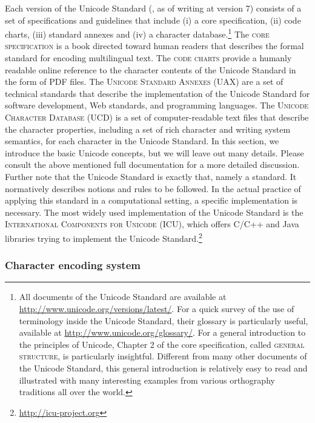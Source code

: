 Each version of the Unicode Standard (\citealp{Unicode2014}, as of writing at
version 7) consists of a set of specifications and guidelines that include (i) a
core specification, (ii) code charts, (iii) standard annexes and (iv) a
character database.\footnote{All documents of the Unicode Standard are available
at \url{http://www.unicode.org/versions/latest/}. For a quick survey of the use
of terminology inside the Unicode Standard, their glossary is particularly
useful, available at \url{http://www.unicode.org/glossary/}. For a general
introduction to the principles of Unicode, Chapter 2 of the core specification,
called \textsc{general structure}, is particularly insightful. Different from
many other documents of the Unicode Standard, this general introduction is
relatively easy to read and illustrated with many interesting examples from
various orthography traditions all over the world.} The \textsc{core
specification} is a book directed toward human readers that describes the formal
standard for encoding multilingual text. The \textsc{code charts} provide a
humanly readable online reference to the character contents of the Unicode
Standard in the form of PDF files. The \textsc{Unicode Standard Annexes (UAX)}
are a set of technical standards that describe the implementation of the Unicode
Standard for software development, Web standards, and programming languages.
The \textsc{Unicode Character Database (UCD)} is a set of computer-readable text
files that describe the character properties, including a set of rich character
and writing system semantics, for each character in the Unicode Standard. In
this section, we introduce the basic Unicode concepts, but we will leave out
many details. Please consult the above mentioned full documentation for a more
detailed discussion. Further note that the Unicode Standard is exactly that,
namely a standard. It normatively describes notions and rules to be followed. In
the actual practice of applying this standard in a computational setting, a
specific implementation is necessary. The most widely used implementation of the
Unicode Standard is the \textsc{International Components for Unicode (ICU)},
which offers C/C++ and Java libraries trying to implement the Unicode
Standard.\footnote{\url{http://icu-project.org}}

\subsubsection*{Character encoding system}

